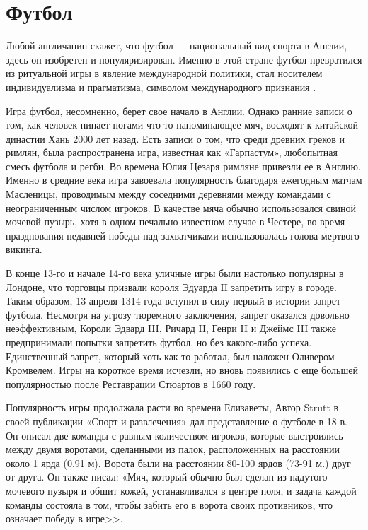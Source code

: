 \section{Футбол}

Любой англичанин скажет, что футбол --- национальный вид спорта в Англии, здесь он изобретен и популяризирован. Именно в этой стране футбол превратился из ритуальной игры в явление международной политики, стал носителем индивидуализма и прагматизма, символом международного признания \cite{football}.

Игра футбол, несомненно, берет свое начало в Англии. Однако ранние записи о том, как человек пинает ногами что-то напоминающее мяч, восходят к китайской династии Хань 2000 лет назад. Есть записи о том, что среди древних греков и римлян, была распространена игра, известная как «Гарпастум», любопытная смесь футбола и регби. Во времена Юлия Цезаря римляне привезли ее в Англию. Именно в средние века игра завоевала популярность благодаря ежегодным матчам Масленицы, проводимым между соседними деревнями между командами с неограниченным числом игроков. В качестве мяча обычно использовался свиной мочевой пузырь, хотя в одном печально известном случае в Честере, во время празднования недавней победы над захватчиками использовалась голова мертвого викинга.

В конце 13-го и начале 14-го века уличные игры были настолько популярны в Лондоне, что торговцы призвали короля Эдуарда II запретить игру в городе.  Таким образом, 13 апреля 1314 года вступил в силу первый в истории запрет футбола. Несмотря на угрозу тюремного заключения, запрет оказался довольно неэффективным, Короли Эдвард III, Ричард II, Генри II и Джеймс III также предпринимали попытки запретить футбол, но без какого-либо успеха. Единственный запрет, который хоть как-то работал, был наложен Оливером Кромвелем. Игры на короткое время исчезли, но вновь появились с еще большей популярностью после Реставрации Стюартов в 1660 году.

Популярность игры продолжала расти во времена Елизаветы, Автор Strutt в своей публикации «Спорт и развлечения» дал представление о футболе в 18 в. Он описал две команды с равным количеством игроков, которые выстроились между двумя воротами, сделанными из палок, расположенных на расстоянии около 1 ярда (0,91 м). Ворота были на расстоянии 80-100 ярдов (73-91 м.) друг от друга. Он также писал: «Мяч, который обычно был сделан из надутого мочевого пузыря и обшит кожей, устанавливался в центре поля, и задача каждой команды состояла в том, чтобы забить его в ворота своих противников, что означает победу в игре>>.

